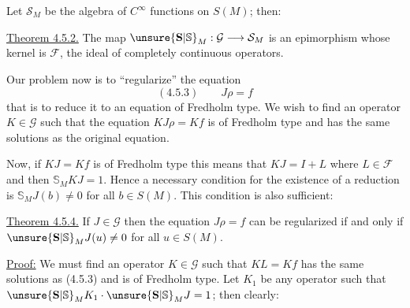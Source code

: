 
Let $\mathcal{S}_M$ be the algebra of $C^\infty$ functions on $S(M)$; then:

\uline{Theorem 4.5.2.} The map $\unsure{\mathbf{S}|\mathbb{S}}_M:\mathcal{G}\longrightarrow\mathcal{S}_M$ is an epimorphism whose kernel is $\mathcal{F}$, the ideal of completely continuous operators.

Our problem now is to ``regularize'' the equation
\[
(4.5.3)\qquad J\rho=f
\]
that is to reduce it to an equation of Fredholm type. We wish to find an operator $K\in\mathcal{G}$ such that the equation $KJ\rho=Kf$ is of Fredholm type and has the same solutions as the original equation.

Now, if $KJ=Kf$ is of Fredholm type this means that $KJ=I+L$ where $L\in\mathcal{F}$ and then $\mathbb{S}_MKJ=1$. Hence a necessary condition for the existence of a reduction is $\mathbb{S}_MJ(b)\neq0$ for all $b\in S(M)$. This condition is also sufficient:

\uline{Theorem 4.5.4.} If $J\in\mathcal{G}$ then the equation $J\rho=f$ can be regularized if and only if $\unsure{\mathbf{S}|\mathbb{S}}_MJ(u)\neq0$ for all $u\in S(M)$.

\uline{Proof:} We must find an operator $K\in\mathcal{G}$ such that $KL=Kf$ has the same solutions as (4.5.3) and is of Fredholm type. Let $K_1$ be any operator such that $\unsure{\mathbf{S}|\mathbb{S}}_MK_1\cdot\unsure{\mathbf{S}|\mathbb{S}}_MJ=1$; then clearly:
